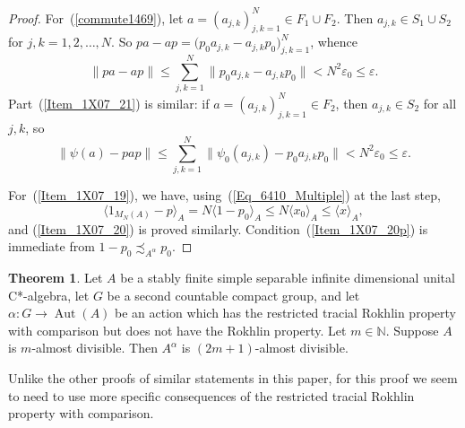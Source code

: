 \documentclass[10pt]{amsart}
\numberwithin{equation}{section}
\theoremstyle{definition}
\newtheorem{thm}{Theorem}[section]
\newcommand{\ep}{\varepsilon}
\newcommand{\ps}{\psi}
\newcommand{\Aut}{{\operatorname{Aut}}}
\newcommand{\ccA}[1]{\langle #1 \rangle_A}
\begin{document}
\begin{proof}
For~(\ref{commute1469}),
let $a = (a_{j, k})_{j, k = 1}^N \in F_1 \cup F_2$.
Then $a_{j, k} \in S_1 \cup S_2$ for $j, k = 1, 2, \ldots, N$.
So $p a - a p = \bigl( p_0 a_{j, k} - a_{j, k} p_0 \bigr)_{j, k = 1}^N$,
whence
\[
\| p a - a p \|
 \leq \sum_{j, k = 1}^N \| p_0 a_{j, k} - a_{j, k} p_0 \|
 < N^2 \ep_0 \leq \ep.
\]
Part~(\ref{Item_1X07_21}) is similar:
if $a = (a_{j, k})_{j, k = 1}^N \in F_2$, then $a_{j, k} \in S_2$
for all $j, k$, so
\[
\| \psi (a) - p a p \|
  \leq \sum_{j, k = 1}^N \| \ps_0 (a_{j, k} ) - p_0 a_{j, k} p_0 \|
   < N^2 \ep_0 \leq \ep.
\]

For~(\ref{Item_1X07_19}), we have, using~(\ref{Eq_6410_Multiple})
at the last step,
\[
\ccA{1_{M_N (A)} - p}
 = N \ccA{1 - p_0}
 \leq N \ccA{x_0}
 \leq \ccA{x},
\]
and (\ref{Item_1X07_20}) is proved similarly.
Condition~(\ref{Item_1X07_20p}) is immediate from
$1 - p_0 \precsim_{A^{\alpha}} p_0$.
\end{proof}

\begin{thm}\label{Alm_Div_TRP}
Let $A$ be a stably finite simple separable infinite dimensional
unital C*-algebra,
let $G$ be a second countable compact group,
and let $\alpha \colon G \to \Aut (A)$ be an action
which has the restricted tracial Rokhlin property with comparison
but does not have the Rokhlin property.
Let $m \in \mathbb{N}$.
Suppose $A$ is $m$-almost divisible.
Then $A^{\alpha}$ is $(2 m + 1)$-almost divisible.
\end{thm}

Unlike the other proofs of similar statements in this paper,
for this proof we seem to need to use more specific consequences
of the restricted tracial Rokhlin property with comparison.
\end{document}
